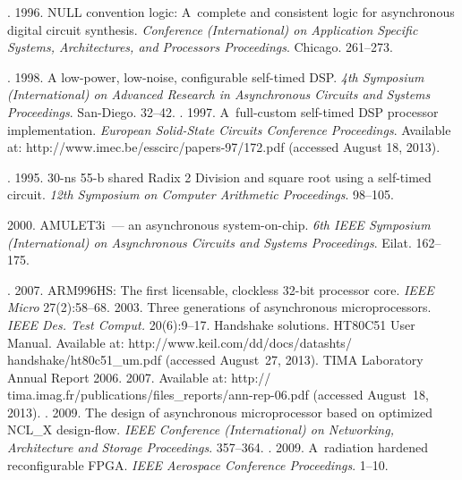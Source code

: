 \begin{multicols}{2}
{{\begin{thebibliography}{99}
. 1996. NULL convention logic: 
A~complete and consistent logic for asynchronous digital circuit synthesis.
\textit{Conference (International) on Application Specific Systems, Architectures, 
and Processors Proceedings}. Chicago. 261--273.

. 
1998. A low-power, low-noise, configurable self-timed DSP. 
\textit{4th  Symposium (International) on Advanced Research in Asynchronous 
Circuits and Systems Proceedings}. San-Diego. 32--42.
. 1997. A~full-custom self-timed DSP processor implementation.
\textit{European Solid-State Circuits Conference Proceedings}. 
Available at: {\sf http://www.imec.be/esscirc/papers-97/172.pdf} 
(accessed August 18, 2013).


. 1995. 
30-ns 55-b shared Radix 2 Division and square root using a self-timed circuit. 
\textit{12th Symposium on Computer Arithmetic Proceedings}. 98--105.

 2000. AMULET3i~--- 
an asynchronous system-on-chip. \textit{6th IEEE  Symposium (International)
on Asynchronous Circuits and Systems Proceedings}. Eilat. 162--175.

. 2007. ARM996HS: The first licensable, clockless 32-bit 
processor core. \textit{IEEE Micro} 27(2):58--68.
2003. Three generations of asynchronous microprocessors.
\textit{IEEE Des. Test Comput.} 20(6):9--17.
Handshake solutions. HT80C51 User Manual. Available at: 
{\sf http://www.keil.com/dd/docs/datashts/ handshake/ht80c51\_um.pdf} 
(accessed August~27, 2013).
TIMA Laboratory Annual Report 2006. 
2007. Available at: 
{\sf http:// tima.imag.fr/publications/files\_reports/ann-rep-06.pdf} (accessed August~18, 2013).
. 
2009. The design of asynchronous microprocessor based on optimized NCL\_X design-flow. 
\textit{IEEE  Conference (International) on  Networking, Architecture and Storage Proceedings}.
357--364.
. 2009. 
A~radiation hardened reconfigurable FPGA. \textit{IEEE Aerospace Conference Proceedings}. 1--10.


\end{thebibliography}}}
\end{multicols}
